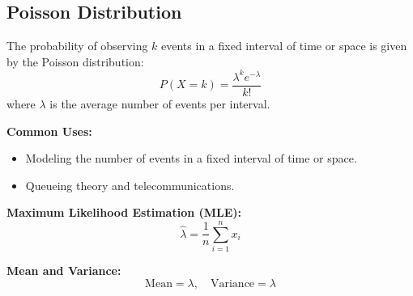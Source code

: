 \documentclass{article}
\begin{document}
\subsection*{Poisson Distribution}
The probability of observing \( k \) events in a fixed interval of time or space is given by the Poisson distribution:
\[
P(X = k) = \frac{\lambda^k e^{-\lambda}}{k!}
\]
where \( \lambda \) is the average number of events per interval.

\textbf{Common Uses:}
\begin{itemize}
    \item Modeling the number of events in a fixed interval of time or space.
    \item Queueing theory and telecommunications.
\end{itemize}

\textbf{Maximum Likelihood Estimation (MLE):}
\[
\hat{\lambda} = \frac{1}{n} \sum_{i=1}^{n} x_i
\]

\textbf{Mean and Variance:}
\[
\text{Mean} = \lambda, \quad \text{Variance} = \lambda
\]
\end{document}
